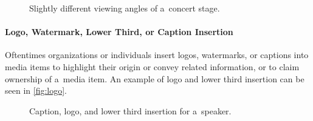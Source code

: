 \begin{figure}[h!]
  \centering
  \caption{Slightly different viewing angles of a~concert stage.}
  \label{fig:viewing-angle}  
\end{figure}

\paragraph{Logo, Watermark, Lower Third, or Caption Insertion}

Oftentimes organizations or individuals insert
logos, watermarks, or captions into media items
to highlight their origin or convey related information,
or to claim ownership of a~media item.
An example of logo and lower third insertion
can be seen in \autoref{fig:logo}.

\begin{figure}[h!]
  \centering
  \caption{Caption, logo, and lower third insertion for a~speaker.}
  \label{fig:logo}  
\end{figure}

